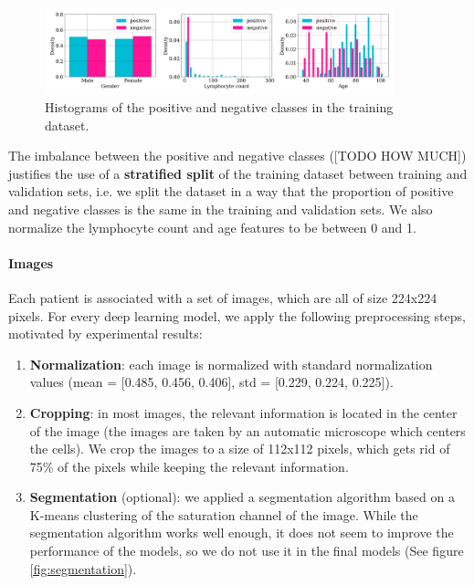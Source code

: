 \documentclass{midl}
\begin{document}
\begin{figure}[h]
    \centering
    \includegraphics[width=0.9\textwidth]{figures/positive_negative_histograms.png}
    \caption{Histograms of the positive and negative classes in the training dataset.}
    \label{fig:positive_negative_histograms}
\end{figure}

The imbalance between the positive and negative classes ([TODO HOW MUCH]) justifies the use of a \textbf{stratified split} of the training dataset between training and validation sets, i.e. we split the dataset in a way that the proportion of positive and negative classes is the same in the training and validation sets. We also normalize the lymphocyte count and age features to be between 0 and 1.

\paragraph*{Images}
Each patient is associated with a set of images, which are all of size 224x224 pixels. For every deep learning model, we apply the following preprocessing steps, motivated by experimental results:
\begin{enumerate}
    \setlength\itemsep{0em}
    \item \textbf{Normalization}: each image is normalized with standard normalization values (mean = [0.485, 0.456, 0.406], std = [0.229, 0.224, 0.225]).
    \item \textbf{Cropping}: in most images, the relevant information is located in the center of the image (the images are taken by an automatic microscope which centers the cells). We crop the images to a size of 112x112 pixels, which gets rid of 75\% of the pixels while keeping the relevant information.
    \item \textbf{Segmentation} (optional): we applied a segmentation algorithm based on a K-means clustering of the saturation channel of the image. While the segmentation algorithm works well enough, it does not seem to improve the performance of the models, so we do not use it in the final models (See figure \ref{fig:segmentation}).
\end{enumerate}
\end{document}
